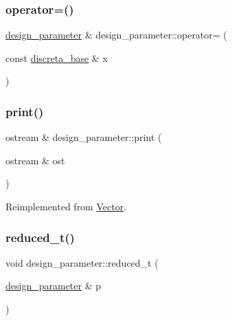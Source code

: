 \mbox{\label{classdesign__parameter_afd2b9a322632021e0e3893c386cfc196}} 
\subsubsection{\texorpdfstring{operator=()}{operator=()}}
{\footnotesize\ttfamily \mbox{\hyperlink{classdesign__parameter}{design\+\_\+parameter}} \& design\+\_\+parameter\+::operator= (\begin{DoxyParamCaption}\item[{const \mbox{\hyperlink{classdiscreta__base}{discreta\+\_\+base}} \&}]{x }\end{DoxyParamCaption})}

\mbox{\label{classdesign__parameter_ac9c431a5408809b0c229eacaa924781b}} 
\subsubsection{\texorpdfstring{print()}{print()}}
{\footnotesize\ttfamily ostream \& design\+\_\+parameter\+::print (\begin{DoxyParamCaption}\item[{ostream \&}]{ost }\end{DoxyParamCaption})\hspace{0.3cm}{\ttfamily [virtual]}}



Reimplemented from \mbox{\hyperlink{class_vector_a71d7e24bcfdfc69d4a2137360acb066c}{Vector}}.

\mbox{\label{classdesign__parameter_a5915575234fd91b3419a36c40f0bc374}} 
\subsubsection{\texorpdfstring{reduced\+\_\+t()}{reduced\_t()}}
{\footnotesize\ttfamily void design\+\_\+parameter\+::reduced\+\_\+t (\begin{DoxyParamCaption}\item[{\mbox{\hyperlink{classdesign__parameter}{design\+\_\+parameter}} \&}]{p }\end{DoxyParamCaption})}

